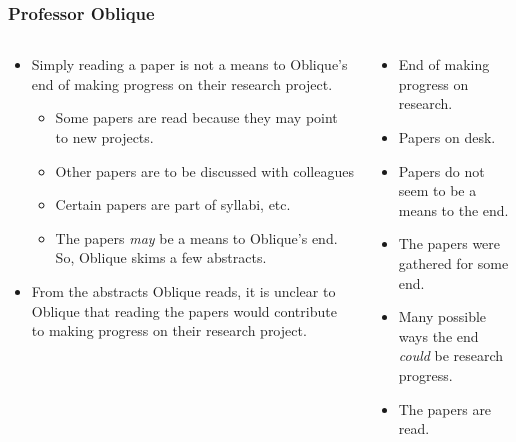 \documentclass[noamssymb, compress, handout]{beamer} %
\begin{document}
\begin{frame}
  \frametitle{Professor Oblique}

  \begin{columns}[c]
    \begin{column}{0.6\textwidth}
      {\addtolength{\leftmargini}{-2\labelsep}
        \begin{itemize}
        \item<1-> Simply reading a paper is not a means to Oblique's end of making progress on their research project.
          \begin{itemize}
          \item<2-> Some papers are read because they may point to new projects.
          \item<2-> Other papers are to be discussed with colleagues
          \item<2-> Certain papers are part of syllabi, etc.
          \item<2-> The papers \emph{may} be a means to Oblique's end.
            So, Oblique skims a few abstracts.
          \end{itemize}
        \item<3-> From the abstracts Oblique reads, it is unclear to Oblique that reading the papers would contribute to making progress on their research project.
        \end{itemize}
      }
    \end{column}
    \vrule{}
    \begin{column}{0.3\textwidth}
      {
        \footnotesize
        \begin{itemize}
        \item End of making progress on research.
        \item Papers on desk.
        \item<3-> Papers do not seem to be a means to the end.
        \item[] {\color{white} The papers were gathered for some end.}
        \item[] {\color{white} Many possible ways the end \emph{could} be research progress.}
        \item[] {\color{white} The papers are read.}
        \end{itemize}
      }
    \end{column}
  \end{columns}

\end{frame}
\end{document}
